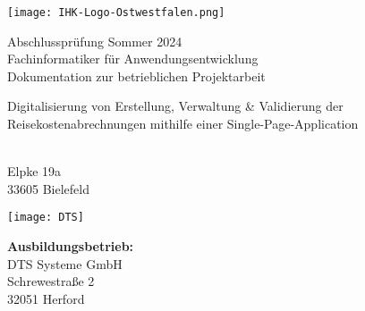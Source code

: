 \begin{titlepage}
    \begin{center}
        \vspace{0.5cm}
        
        \texttt{[image: IHK-Logo-Ostwestfalen.png]}
        
        \vspace{0.5cm}
        
        Abschlussprüfung Sommer 2024\\
        Fachinformatiker für Anwendungsentwicklung\\
        \Large
        Dokumentation zur betrieblichen Projektarbeit
        
        \vspace{0.5cm}
        
        \LARGE
        \textbf{\doctitle}
        
        \Large
        \vspace{0.5cm}
        Digitalisierung von Erstellung, Verwaltung \& Validierung der Reisekostenabrechnungen mithilfe einer Single-Page-Application
        
        \vspace{0.5cm}
        \textbf{\docdate}
        
        \vspace{1.5cm}
        
        \large
        \textbf{\docauthor}\\
        Elpke 19a\\
        33605 Bielefeld
            
        \vfill
        
        \begin{minipage}{0.3\textwidth}
        \centering
            \texttt{[image: DTS]}
        \end{minipage}
        \begin{minipage}{0.45\textwidth}
        \centering
            \textbf{Ausbildungsbetrieb:}\\
            DTS Systeme GmbH\\
            Schrewestraße 2\\
            32051 Herford
        \end{minipage}
            
    \end{center}
\end{titlepage}